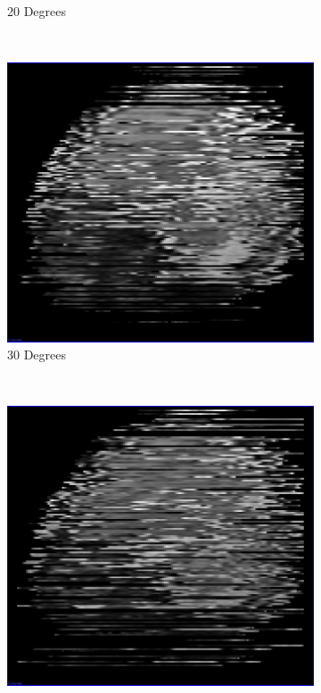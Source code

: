 \begin{figure}[H]
\begin{subfigure}[b]{0.32\textwidth}
    \caption{20 Degrees}\label{fig:scan_simulation_20_degrees}
  \end{subfigure}%
  ~ %
  \begin{subfigure}[b]{0.32\textwidth}
    \includegraphics[width=\textwidth]{images/scan_simulation/scan_simulation_30.png}
    \caption{30 Degrees}\label{fig:scan_simulation_30_degrees}
  \end{subfigure}%
  ~ %
  \begin{subfigure}[b]{0.32\textwidth}
    \includegraphics[width=\textwidth]{images/scan_simulation/scan_simulation_45.png}

\end{subfigure}
\end{figure}
